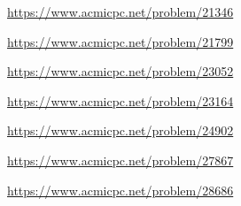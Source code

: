 \begin{problem} \url{https://www.acmicpc.net/problem/21346} \end{problem}
\begin{problem} \url{https://www.acmicpc.net/problem/21799} \end{problem}
\begin{problem} \url{https://www.acmicpc.net/problem/23052} \end{problem}
\begin{problem} \url{https://www.acmicpc.net/problem/23164} \end{problem}
\begin{problem} \url{https://www.acmicpc.net/problem/24902} \end{problem}
\begin{problem} \url{https://www.acmicpc.net/problem/27867} \end{problem}
\begin{problem} \url{https://www.acmicpc.net/problem/28686} \end{problem}